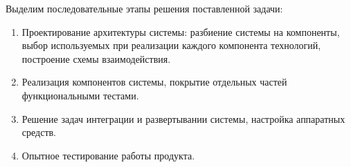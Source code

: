 \documentclass[a4paper,14pt,href]{article}
\begin{document}
Выделим последовательные этапы решения поставленной задачи:
\begin{enumerate}
  \item Проектирование архитектуры системы: разбиение системы на компоненты, выбор используемых при реализации каждого компонента технологий, построение схемы взаимодействия.

  \item Реализация компонентов системы, покрытие отдельных частей функциональными тестами.

  \item Решение задач интеграции и развертывании системы, настройка аппаратных средств.

  \item Опытное тестирование работы продукта.
\end{enumerate}






\newpage
{}



\end{document}

